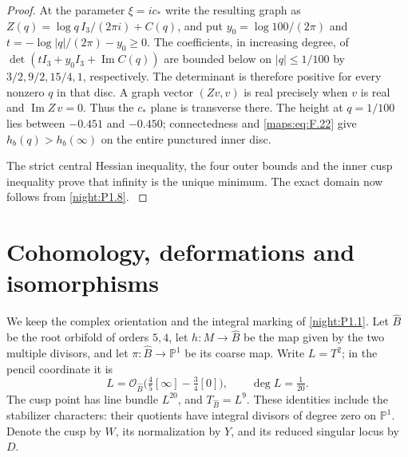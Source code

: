 \begin{proof}
At the parameter $\xi=ic_*$ write the resulting graph as
$Z(q)=\log q\,I_3/(2\pi i)+C(q)$, and put
$y_0=\log100/(2\pi)$ and $t=-\log|q|/(2\pi)-y_0\ge0$.
The coefficients, in increasing degree, of
$\det(tI_3+y_0I_3+\operatorname{Im}C(q))$ are bounded below
on $|q|\le1/100$ by
$3/2,9/2,15/4,1$, respectively.
The determinant is therefore positive for every nonzero $q$
in that disc. A graph vector $(Zv,v)$ is real precisely when
$v$ is real and $\operatorname{Im}Z\,v=0$. Thus the
$c_*$ plane is transverse there. The height at $q=1/100$
lies between $-0.451$ and $-0.450$; connectedness and
\eqref{maps:eq:F.22} give
$h_b(q)>h_b(\infty)$ on the entire punctured inner disc.

The strict central Hessian inequality, the four outer bounds and
the inner cusp inequality prove that infinity is the unique
minimum. The exact domain now follows from
\cref{night:P1.8}.
\hypertarget{tag-03L1}{}\label{layout:V:fresh-splitting}
\end{proof}


\section{Cohomology, deformations and isomorphisms}

We keep the complex orientation and the integral marking of \cref{night:P1.1}.
Let $\widehat B$ be the root orbifold of orders $5,4$, let
$h:M\to\widehat B$ be the map given by the two multiple divisors,
and let $\pi:\widehat B\to\mathbb P^1$ be its coarse map.
Write $L=T^2$; in the pencil coordinate it is
\[
 L=\mathcal O_{\widehat B}\bigl(\tfrac45[\infty]
                  -\tfrac34[0]\bigr),\qquad \deg L=\tfrac1{20}.
\]
The cusp point has line bundle $L^{20}$, and
$T_{\widehat B}=L^9$. These identities include the stabilizer
characters: their quotients have integral divisors of degree zero
on $\mathbb P^1$. Denote the cusp by $W$, its normalization by $Y$,
and its reduced singular locus by $D$.

